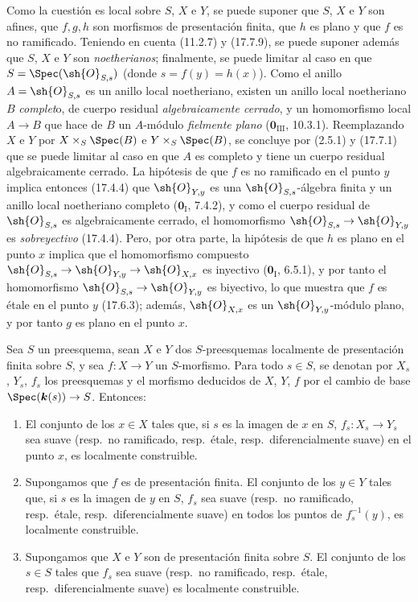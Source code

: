 Como la cuestión es local sobre $S$, $X$ e $Y$, se puede suponer que $S$, $X$ e $Y$ son afines, que $f,g,h$ son morfismos de presentación finita, que $h$ es plano y que $f$ es no ramificado. Teniendo en cuenta (11.2.7) y (17.7.9), se puede suponer además que $S$, $X$ e $Y$ son \emph{noetherianos}; finalmente, se puede limitar al caso en que $S=\Spec(\sh{O}_{S,s})$ (donde $s=f(y)=h(x)$). Como el anillo $A=\sh{O}_{S,s}$ es un anillo local noetheriano, existen un anillo local noetheriano $B$ \emph{complet}o, de cuerpo residual \emph{algebraicamente cerrado}, y un homomorfismo local $A\to B$ que hace de $B$ un $A$-módulo \emph{fielmente plano} ($\mathbf{0}_{\mathrm{III}}$, 10.3.1). Reemplazando $X$ e $Y$ por $X\times_S\Spec(B)$ e $Y\times_S\Spec(B)$, se concluye por (2.5.1) y (17.7.1) que se puede limitar al caso en que $A$ es completo y tiene un cuerpo residual algebraicamente cerrado. La hipótesis de que $f$ es no ramificado en el punto $y$ implica entonces (17.4.4) que $\sh{O}_{Y,y}$ es una $\sh{O}_{S,s}$-álgebra finita y un anillo local noetheriano completo ($\mathbf{0}_{\mathrm I}$, 7.4.2), y como el cuerpo residual de $\sh{O}_{S,s}$ es algebraicamente cerrado, el homomorfismo $\sh{O}_{S,s}\to\sh{O}_{Y,y}$ es \emph{sobreyectivo} (17.4.4). Pero, por otra parte, la hipótesis de que $h$ es plano en el punto $x$ implica que el homomorfismo compuesto $\sh{O}_{S,s}\to\sh{O}_{Y,y}\to\sh{O}_{X,x}$ es inyectivo ($\mathbf{0}_{\mathrm I}$, 6.5.1), y por tanto el homomorfismo $\sh{O}_{S,s}\to\sh{O}_{Y,y}$ es biyectivo, lo que muestra que $f$ es étale en el punto $y$ (17.6.3); además, $\sh{O}_{X,x}$ es un $\sh{O}_{Y,y}$-módulo plano, y por tanto $g$ es plano en el punto $x$.

\begin{proposition}[17.7.11]
\label{IV.17.7.11}
Sea $S$ un preesquema, sean $X$ e $Y$ dos $S$-preesquemas localmente de presentación finita sobre $S$, y sea $f:X\to Y$ un $S$-morfismo. Para todo $s\in S$, se denotan por $X_s$, $Y_s$, $f_s$ los preesquemas y el morfismo deducidos de $X$, $Y$, $f$ por el cambio de base $\Spec(\boldsymbol{k}(s))\to S$. Entonces:
\begin{enumerate}
  \item[\textup{(i)}] El conjunto de los $x\in X$ tales que, si $s$ es la imagen de $x$ en $S$, $f_s:X_s\to Y_s$ sea suave \textup{(resp.}\ no ramificado, \textup{resp.}\ étale, \textup{resp.}\ diferencialmente suave\textup{)} en el punto $x$, es localmente construible.
  \item[\textup{(ii)}] Supongamos que $f$ es de presentación finita. El conjunto de los $y\in Y$ tales que, si $s$ es la imagen de $y$ en $S$, $f_s$ sea suave \textup{(resp.}\ no ramificado, \textup{resp.}\ étale, \textup{resp.}\ diferencialmente suave\textup{)} en todos los puntos de $f_s^{-1}(y)$, es localmente construible.
  \item[\textup{(iii)}] Supongamos que $X$ e $Y$ son de presentación finita sobre $S$. El conjunto de los $s\in S$ tales que $f_s$ sea suave \textup{(resp.}\ no ramificado, \textup{resp.}\ étale, \textup{resp.}\ diferencialmente suave\textup{)} es localmente construible.
\end{enumerate}
\end{proposition}

